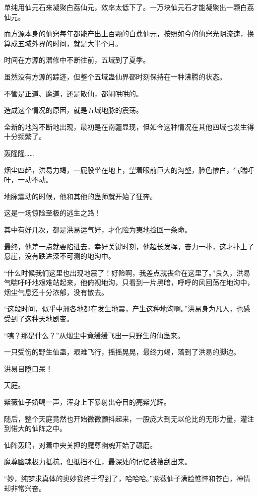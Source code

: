 \begin{this_body}
单纯用仙元石来凝聚白荔仙元，效率太低下了。一万块仙元石才能凝聚出一颗白荔仙元。

而方源本身的仙窍每年都能产出上百颗的白荔仙元，按照如今的仙窍光阴流速，换算成五域外界的时间，就是大半个月。

时间在方源的潜修中不断往前，五域到了夏季。

虽然没有方源的踪迹，但整个五域蛊仙界都时刻保持在一种沸腾的状态。

不管是正道、魔道，还是散仙，都闹哄哄的。

造成这个情况的原因，就是五域地脉的震荡。

全新的地沟不断地出现，最初是在南疆显现，但如今这种情况在其他四域也发生得十分频繁了。

轰隆隆……

烟尘四起，洪易力竭，一屁股坐在地上，望着眼前巨大的沟壑，脸色惨白，气喘吁吁，一动不动。

地脉震动的时候，他和其他的蛊师就开始了狂奔。

这是一场惊险至极的逃生之路！

其中有好几次，都是洪易运气好，才化险为夷地捡回一条命。

最终，他差一点就要陷进去，幸好关键时刻，他超长发挥，奋力一扑，这才扑上了悬崖，没有跌进深不可测的地沟中。

“什么时候我们这里也出现地震了！好险啊，我差点就丧命在这里了。”良久，洪易气喘吁吁地艰难站起来，他俯视地沟，只看到一片黑暗，呼呼的风回荡在地沟中，烟尘气息还十分浓郁，没有散去。

“这段时间，似乎中洲各地都在发生地震，产生这种地沟啊。”洪易身为凡人，也感受到了这种天地剧变。

“咦？那是什么？”从烟尘中竟缓缓飞出一只野生的仙蛊来。

一只受伤的野生仙蛊，艰难飞行，摇摇晃晃，最终力竭，落到了洪易的脚边。

洪易目瞪口呆！

天庭。

紫薇仙子娇喝一声，浑身上下暴射出夺目的亮紫光辉。

随后，整个天庭竟然也开始微微颤抖起来，一股庞大到无以伦比的无形力量，灌注到偌大的仙阵之中。

仙阵轰鸣，对着中央关押的魔尊幽魂开始了碾磨。

魔尊幽魂极力抵抗，但抵挡不住，最深处的记忆被搜刮出来。

“妙，纯梦求真体的奥妙我终于得到了，哈哈哈。”紫薇仙子满脸憔悴和苍白，神情却非常兴奋。


\end{this_body}
